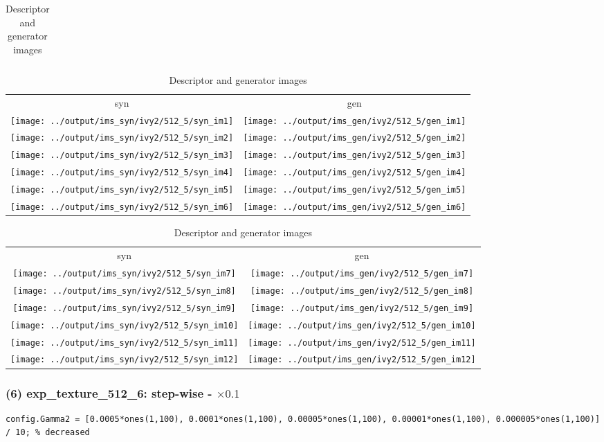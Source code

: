 \documentclass[letter]{article}
\begin{document}
\begin{table}[h!]
\begin{tabular}{c}
	\end{tabular}
	\begin{tabular}{cc}
		syn & gen\tabularnewline
		\texttt{[image: ../output/ims\_syn/ivy2/512\_5/syn\_im1]} & \texttt{[image: ../output/ims\_gen/ivy2/512\_5/gen\_im1]} \tabularnewline
		\texttt{[image: ../output/ims\_syn/ivy2/512\_5/syn\_im2]} & \texttt{[image: ../output/ims\_gen/ivy2/512\_5/gen\_im2]} \tabularnewline
		\texttt{[image: ../output/ims\_syn/ivy2/512\_5/syn\_im3]} & \texttt{[image: ../output/ims\_gen/ivy2/512\_5/gen\_im3]} \tabularnewline
		\texttt{[image: ../output/ims\_syn/ivy2/512\_5/syn\_im4]} & \texttt{[image: ../output/ims\_gen/ivy2/512\_5/gen\_im4]} \tabularnewline
		\texttt{[image: ../output/ims\_syn/ivy2/512\_5/syn\_im5]} & \texttt{[image: ../output/ims\_gen/ivy2/512\_5/gen\_im5]} \tabularnewline
		\texttt{[image: ../output/ims\_syn/ivy2/512\_5/syn\_im6]} & \texttt{[image: ../output/ims\_gen/ivy2/512\_5/gen\_im6]} \tabularnewline
	\end{tabular}
	\begin{tabular}{cc}
		syn & gen\tabularnewline
		\texttt{[image: ../output/ims\_syn/ivy2/512\_5/syn\_im7]} & \texttt{[image: ../output/ims\_gen/ivy2/512\_5/gen\_im7]} \tabularnewline
		\texttt{[image: ../output/ims\_syn/ivy2/512\_5/syn\_im8]} & \texttt{[image: ../output/ims\_gen/ivy2/512\_5/gen\_im8]} \tabularnewline
		\texttt{[image: ../output/ims\_syn/ivy2/512\_5/syn\_im9]} & \texttt{[image: ../output/ims\_gen/ivy2/512\_5/gen\_im9]} \tabularnewline
		\texttt{[image: ../output/ims\_syn/ivy2/512\_5/syn\_im10]} & \texttt{[image: ../output/ims\_gen/ivy2/512\_5/gen\_im10]} \tabularnewline
		\texttt{[image: ../output/ims\_syn/ivy2/512\_5/syn\_im11]} & \texttt{[image: ../output/ims\_gen/ivy2/512\_5/gen\_im11]} \tabularnewline
		\texttt{[image: ../output/ims\_syn/ivy2/512\_5/syn\_im12]} & \texttt{[image: ../output/ims\_gen/ivy2/512\_5/gen\_im12]} \tabularnewline
	\end{tabular}
	\caption{Descriptor and generator images}
\end{table}
\newpage

\subsubsection*{(6) exp\_texture\_512\_6: step-wise - $\times0.1$}

\begin{lstlisting}
config.Gamma2 = [0.0005*ones(1,100), 0.0001*ones(1,100), 0.00005*ones(1,100), 0.00001*ones(1,100), 0.000005*ones(1,100)] / 10; % decreased 
\end{lstlisting}
\end{document}
